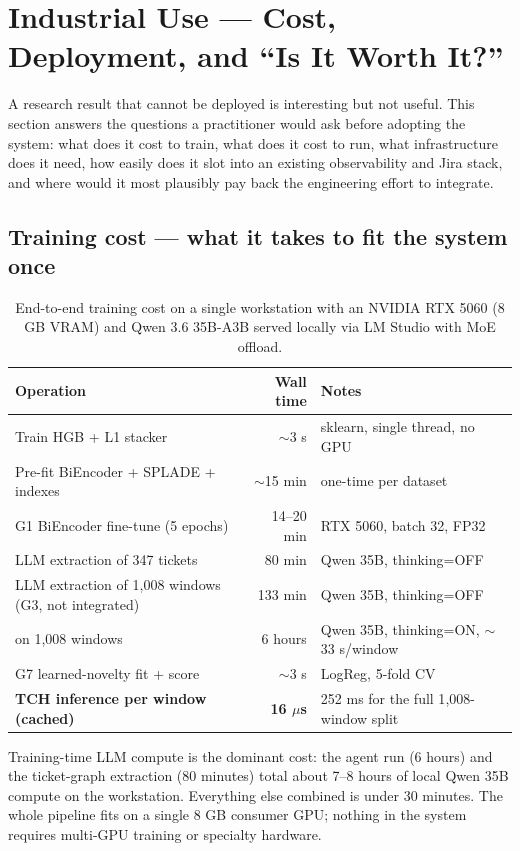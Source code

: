 \section{Industrial Use --- Cost, Deployment, and ``Is It Worth It?''}
\label{sec:industrial}

A research result that cannot be deployed is interesting but not useful. This section answers the questions a practitioner would ask before adopting the system: what does it cost to train, what does it cost to run, what infrastructure does it need, how easily does it slot into an existing observability and Jira stack, and where would it most plausibly pay back the engineering effort to integrate.

\subsection{Training cost --- what it takes to fit the system once}

\begin{table}[h]
\centering
\caption{End-to-end training cost on a single workstation with an NVIDIA RTX 5060 (8 GB VRAM) and Qwen 3.6 35B-A3B served locally via LM Studio with MoE offload.}
\label{tab:cost}
\small
\begin{tabularx}{\linewidth}{l r X}
\toprule
Operation & Wall time & Notes \\
\midrule
Train HGB + L1 stacker             & $\sim$3 s & sklearn, single thread, no GPU \\
Pre-fit BiEncoder + SPLADE + indexes & $\sim$15 min & one-time per dataset \\
G1 BiEncoder fine-tune (5 epochs)  & 14--20 min & RTX 5060, batch 32, FP32 \\
LLM extraction of 347 tickets      & 80 min & Qwen 35B, thinking=OFF \\
LLM extraction of 1{,}008 windows (G3, not integrated) & 133 min & Qwen 35B, thinking=OFF \\
\agent{} on 1{,}008 windows        & 6 hours & Qwen 35B, thinking=ON, $\sim$33 s/window \\
G7 learned-novelty fit + score     & $\sim$3 s & LogReg, 5-fold CV \\
\midrule
\textbf{TCH inference per window (cached)} & \textbf{16 $\mu$s} & 252 ms for the full 1{,}008-window split \\
\bottomrule
\end{tabularx}
\end{table}

Training-time LLM compute is the dominant cost: the agent run (6 hours) and the ticket-graph extraction (80 minutes) total about 7--8 hours of local Qwen 35B compute on the workstation. Everything else combined is under 30 minutes. The whole pipeline fits on a single 8 GB consumer GPU; nothing in the system requires multi-GPU training or specialty hardware.

